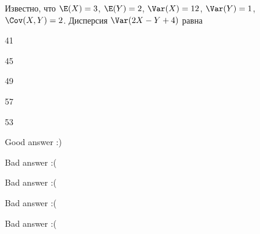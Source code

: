 
\begin{question}
Известно, что \(\E(X)=3\), \(\E(Y)=2\), \(\Var(X)=12\), \(\Var(Y)=1\),
\(\Cov(X,Y)=2\). Дисперсия \(\Var(2X-Y+4)\) равна
\begin{answerlist}
  \item 41
  \item 45
  \item 49
  \item 57
  \item 53
\end{answerlist}
\end{question}

\begin{solution}
\begin{answerlist}
  \item Good answer :)
  \item Bad answer :(
  \item Bad answer :(
  \item Bad answer :(
  \item Bad answer :(
\end{answerlist}
\end{solution}

